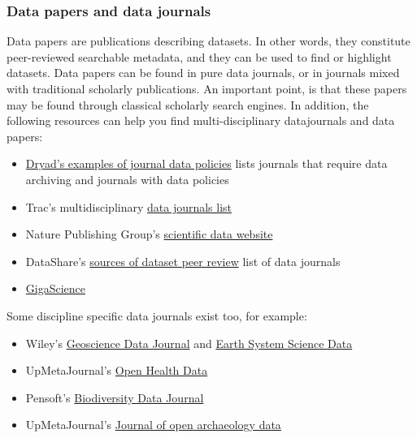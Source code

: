 \subsubsection{Data papers and data journals}

 Data papers are publications describing datasets. In other words, they constitute peer-reviewed searchable metadata, and they can be used to find or highlight datasets. Data papers can be found in pure data journals, or in journals mixed with traditional scholarly publications. An important point, is that these papers may be found through classical scholarly search engines. In addition, the following resources can help you find multi-disciplinary datajournals and data papers:
\begin{itemize}
\item {} \href{http://wiki.datadryad.org/Journal_instructions#Examples_of_journal_data_policies}{Dryad's examples of journal data policies} lists journals that require data archiving and journals with data policies \cite{dryad_journal_2015}
\item {} Trac's multidisciplinary \href{http://proj.badc.rl.ac.uk/preparde/blog/DataJournalsList}{data journals list}\cite{trac_blog:_2013}
\item {} Nature Publishing Group's \href{http://www.nature.com/sdata/}{scientific data website} \cite{nature_publishing_group_scientific_2015}
\item DataShare's \href{https://www.wiki.ed.ac.uk/display/datashare/Sources+of+dataset+peer+review}{sources of dataset peer review} list of data journals \cite{datashare_sources_2015}
\item {} \href{http://www.gigasciencejournal.com/}{GigaScience} \cite{gigascience_gigascience_2015}
\end{itemize}

Some discipline specific data journals exist too, for example:
\begin{itemize}
\item {}  Wiley's \href{http://onlinelibrary.wiley.com/journal/10.1002/(ISSN)2049-6060}{Geoscience Data Journal} and \href{http://www.earth-system-science-data.net/}{Earth System Science Data} \cite{earth_system_science_data_essd_2015}
\item {} UpMetaJournal's \href{http://openhealthdata.metajnl.com/}{Open Health Data} \cite{upmetajournals_open_2015}
\item {} Pensoft's \href{http://biodiversitydatajournal.com/}{Biodiversity Data Journal} \cite{pensoft_biodiversity_2015}
\item {} UpMetaJournal's \href{http://openarchaeologydata.metajnl.com/}{Journal of open archaeology data} \cite{upmetajournals_journal_2015}
\end{itemize}

